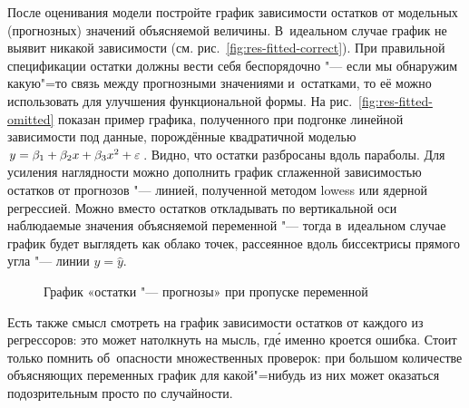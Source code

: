 \documentclass[final,pdftex]{../../template/epsilonj}
\begin{document}
После оценивания модели постройте график зависимости остатков от модельных (прогнозных) значений объясняемой величины. В~идеальном случае график не выявит никакой зависимости (см. рис.~\ref{fig:res-fitted-correct}). При правильной спецификации остатки должны вести себя беспорядочно "--- если мы обнаружим какую"=то связь между прогнозными значениями и~остатками, то её можно использовать для улучшения функциональной формы. На рис.~\ref{fig:res-fitted-omitted} показан пример графика, полученного при подгонке линейной зависимости под данные, порождённые квадратичной моделью $y = \beta_1 + \beta_2 x + \beta_3 x^2 + \varepsilon$. Видно, что остатки разбросаны вдоль параболы. Для усиления наглядности можно дополнить график сглаженной зависимостью остатков от прогнозов "--- линией, полученной методом lowess или ядерной регрессией. Можно вместо остатков откладывать по вертикальной оси наблюдаемые значения объясняемой переменной "--- тогда в~идеальном случае график будет выглядеть как облако точек, рассеянное вдоль биссектрисы прямого угла "--- линии $y = \hat y$.

\begin{figure}[hbtp]
	\centering
	 \quad
	\caption{График «остатки "--- прогнозы» при пропуске переменной}
\end{figure}

Есть также смысл смотреть на график зависимости остатков от каждого из регрессоров: это может натолкнуть на мысль, гд\'{е} именно кроется ошибка. Стоит только помнить об~опасности множественных проверок: при большом количестве объясняющих переменных график для какой"=нибудь из них может оказаться подозрительным просто по случайности.
\end{document}
